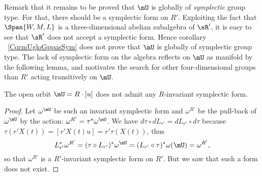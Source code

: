 Remark  that it remains to be proved that $\mU$ is globally of \emph{symplectic} group type. For that, there should be a symplectic form on $R'$. Exploiting the fact that $\Span\{W,M,L \}$ is a three-dimensional abelian subalgebra of $\sR'$, it is easy to see that $\sR'$ does not accept a symplectic form. Hence  corollary ~\ref{CormUgloGppasSym} does not prove that $\mU$ is globally of symplectic group type. The lack of symplectic form on the algebra reflects on $\mU$ as manifold by the following lemma, and motivates the search for other four-dimensional groups than $R'$ acting transitively on $\mU$.

\begin{lemma}
	The open orbit $\mU=R\cdot [u]$ does not admit any $R$-invariant symplectic form.
\end{lemma}

\begin{proof}
	Let $\omega^{\mU}$ be such an invariant symplectic form and $\omega^{R'}$ be the pull-back of $\omega^{\mU}$ by the action: $\omega^{R'}=\tau^*\omega^{\mU}$.
	We have $d\tau\circ dL_{r'}=dL_{r'}\circ d\tau$ because $\tau(r'X(t))=[r'X(t)u]=r'\tau(X(t))$, thus
	\[
		L_{r'}^*\omega^{R'}=(\tau\circ L_{r'})^*\omega^{\mU}=(L_{r'}\circ\tau)^*\omega(\mU)=\omega^{R'},
	\]
	so that $\omega^{R'}$ is a $R'$-invariant symplectic form on $R'$. But we saw that such a form does not exist.
\end{proof}

